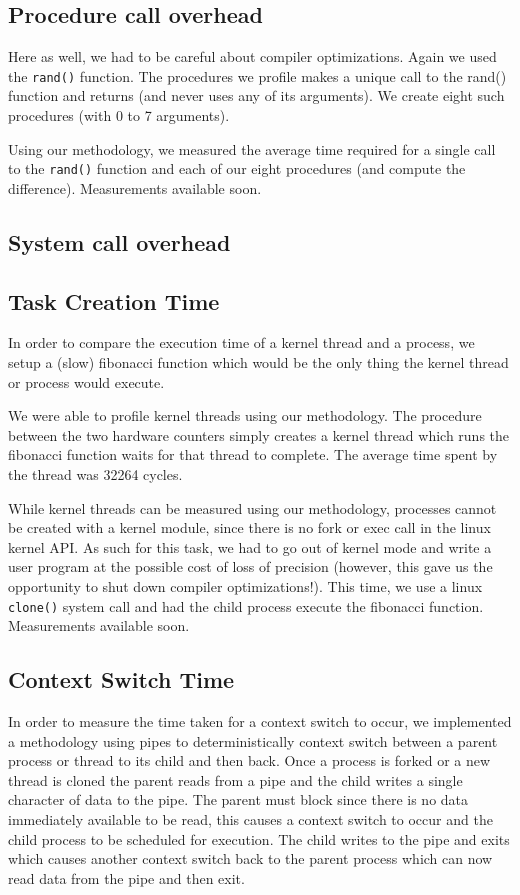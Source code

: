 \subsection{Procedure call overhead}

Here as well, we had to be careful about compiler optimizations. Again we used
the \texttt{rand()} function. The procedures we profile makes a unique call to
the rand() function and returns (and never uses any of its arguments). We create
eight such procedures (with 0 to 7 arguments).

Using our methodology, we measured the average time required for a single call
to the \texttt{rand()} function and each of our eight procedures (and compute
the difference). Measurements available soon.

\subsection{System call overhead}

\subsection{Task Creation Time}

In order to compare the execution time of a kernel thread and a process, we
setup a (slow) fibonacci function which would be the only thing the kernel
thread or process would execute.

We were able to profile kernel threads using our methodology. The procedure
between the two hardware counters simply creates a kernel thread which runs the
fibonacci function waits for that thread to complete. The average time spent by
the thread was 32264 cycles.

While kernel threads can be measured using our methodology, processes cannot be
created with a kernel module, since there is no fork or exec call in the linux
kernel API. As such for this task, we had to go out of kernel mode and write a
user program at the possible cost of loss of precision (however, this gave us
the opportunity to shut down compiler optimizations!). This time, we use a linux
\texttt{clone()} system call and had the child process execute the fibonacci
function. Measurements available soon.

\subsection{Context Switch Time} 

In order to measure the time taken for a context switch to occur, we implemented
a methodology using pipes to deterministically context switch between a parent
process or thread to its child and then back. Once a process is forked or a new
thread is cloned the parent reads from a pipe and the child writes a single
character of data to the pipe. The parent must block since there is no data
immediately available to be read, this causes a context switch to occur and the
child process to be scheduled for execution. The child writes to the pipe and
exits which causes another context switch back to the parent process which can
now read data from the pipe and then exit. 

